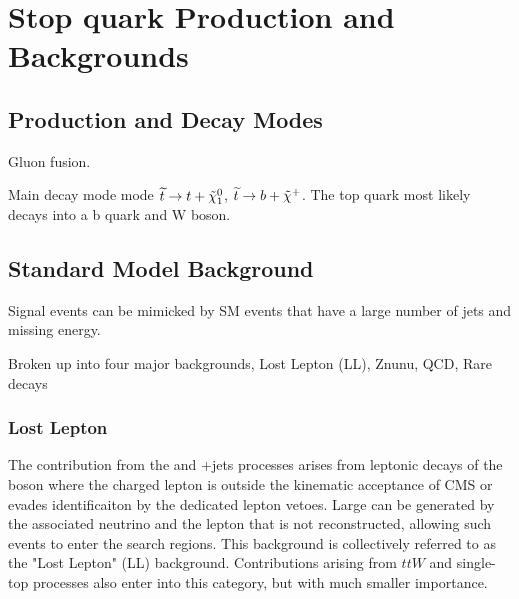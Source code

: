 \chapter{Stop quark Production and Backgrounds}
\label{ch:Search}



\section{Production and Decay Modes}
\label{sec:Production}

Gluon fusion.

Main decay mode mode $\widetilde{t}\rightarrow t+\tilde{\chi}^{0}_{1}$, $\widetilde{t}\rightarrow b+\tilde{\chi}^{+}$. The top quark most likely decays into a b quark and W boson. 

\section{Standard Model Background}
\label{sec:SMBackground}

Signal events can be mimicked by SM events that have a large number of jets and missing energy. 

Broken up into four major backgrounds, Lost Lepton (LL), Znunu, QCD, Rare decays

\subsection{Lost Lepton}
\label{subsec:LL}

The contribution from the \ttbar{} and \W+jets processes arises from leptonic decays of the \W boson where the charged lepton is outside the kinematic acceptance of CMS or evades identificaiton by the dedicated lepton vetoes. Large \met can be generated by the associated neutrino and the lepton that is not reconstructed, allowing such events to enter the search regions. This background is collectively referred to as the "Lost Lepton" (LL) background. Contributions arising from $ttW$ and single-top processes also enter into this category, but with much smaller importance. 

